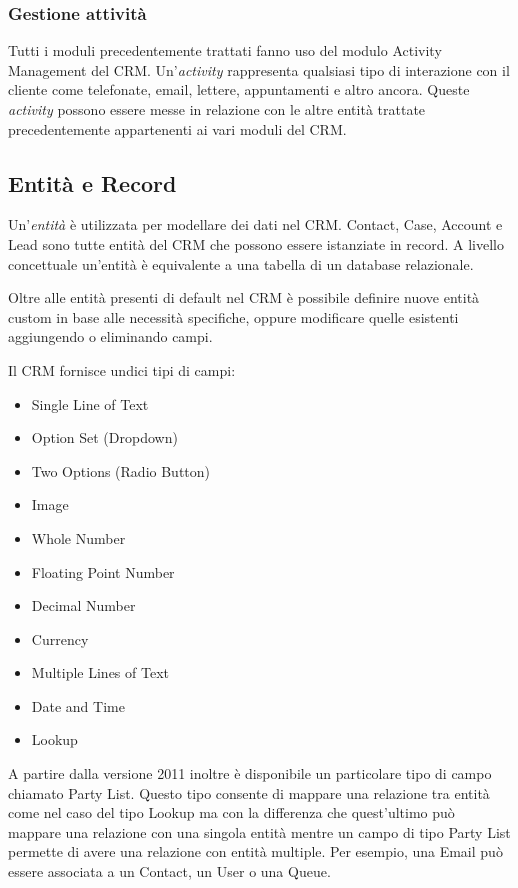 \subsubsection{Gestione attività}
\label{sssec:gestione-attivita}
Tutti i moduli precedentemente trattati fanno uso del modulo Activity Management del CRM. Un'\textit{activity} rappresenta qualsiasi tipo di interazione con il cliente come telefonate, email, lettere, appuntamenti e altro ancora. Queste \textit{activity} possono essere messe in relazione con le altre entità trattate precedentemente appartenenti ai vari moduli del CRM.

\subsection{Entità e Record}
Un'\textit{entità} è utilizzata per modellare dei dati nel CRM. Contact, Case, Account e Lead sono tutte entità del CRM che possono essere istanziate in record. A livello concettuale un'entità è equivalente a una tabella di un database relazionale.

Oltre alle entità presenti di default nel CRM è possibile definire nuove entità custom in base alle necessità specifiche, oppure modificare quelle esistenti aggiungendo o eliminando campi.

Il CRM fornisce undici tipi di campi:
\begin{itemize}
  \item Single Line of Text
  \item Option Set (Dropdown)
  \item Two Options (Radio Button)
  \item Image
  \item Whole Number
  \item Floating Point Number
  \item Decimal Number
  \item Currency
  \item Multiple Lines of Text
  \item Date and Time
  \item Lookup
\end{itemize} 

A partire dalla versione 2011 inoltre è disponibile un particolare tipo di campo chiamato Party List. Questo tipo consente di mappare una relazione tra entità come nel caso del tipo Lookup ma con la differenza che quest'ultimo può mappare una relazione con una singola entità mentre un campo di tipo Party List permette di avere una relazione con entità multiple. Per esempio, una Email può essere associata a un Contact, un User o una Queue.~\cite{DynamicsTutorialspoint}


